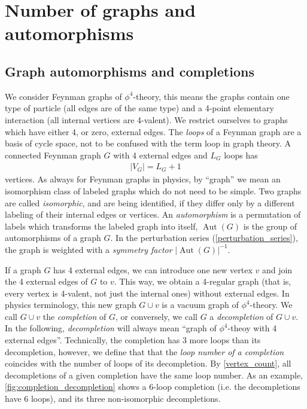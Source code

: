 \documentclass[11pt,a4paper]{article}
\newcommand{\abs}[1]{\lvert #1 \rvert}
\newcommand{\Aut}{\operatorname{Aut}}
\renewcommand{\|}{\rule[-0.4ex]{0.2ex}{1.2em}}
\begin{document}
\newpage



	
\section{Number of graphs and automorphisms}\label{sec:number_of_graphs}


\subsection{Graph automorphisms and completions}\label{sec:automorphism}





We consider Feynman graphs of $\phi^4$-theory, this means the graphs contain one type of particle (all edges are of the same type) and a 4-point elementary interaction (all internal vertices are 4-valent). We restrict ourselves to graphs which have either 4, or zero, external edges. The \emph{loops} of a Feynman graph are a basis of cycle space, not to be confused with the term loop in graph theory. A connected Feynman graph $G$ with 4 external edges and $L_G$ loops has 
\begin{align}\label{vertex_count}
	\abs{V_G}=L_G+1
\end{align}
vertices. 
As always for Feynman graphs in physics, by \enquote{graph} we mean an  isomorphism class of labeled graphs which do not need to be simple. Two graphs are called \emph{isomorphic}, and are being identified, if they differ only by a different labeling of their internal edges or vertices. An \emph{automorphism} is a permutation of labels which transforms the labeled graph into itself,  $\Aut(G)$ is the group of automorphisms of a graph $G$. In the perturbation series (\cref{perturbation_series}), the graph is weighted  with a \emph{symmetry factor} $\abs{\Aut(G)}^{-1}$. 




If a graph $G$  has 4 external edges, we can introduce one new vertex $v$ and join the 4 external edges of $G$ to $v$. This way, we obtain a 4-regular graph (that is, every vertex is 4-valent, not just the internal ones) without external edges. In physics terminology, this new graph $G\cup v$ is a vacuum graph of $\phi^4$-theory. We call $G\cup v$ the \emph{completion} of $G$, or conversely, we call $G$   a \emph{decompletion} of $G\cup v$. In the following, \emph{decompletion} will always mean \enquote{graph of $\phi^4$-theoy with 4 external edges}. Technically, the completion has 3 more loops than its decompletion, however, we define that that the \emph{loop number of a completion} coincides with the number of loops of its decompletion.   By \cref{vertex_count}, all decompletions of a given completion have the same loop number. 
As an example, \cref{fig:completion_decompletion} shows a 6-loop completion (i.e. the decompletions have 6 loops), and its three non-isomorphic decompletions. 
\end{document}
